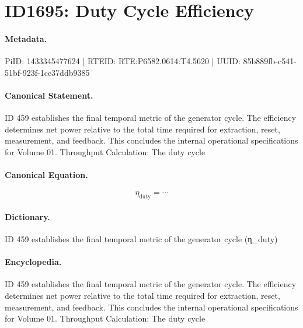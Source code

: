 \section*{ID1695: Duty Cycle Efficiency}
\paragraph{Metadata.}
PiID: 1433345477624 | RTEID: RTE:P6582.0614:T4.5620 | UUID: 85b889fb-c541-51bf-923f-1ce37ddb9385

\paragraph{Canonical Statement.}
ID 459 establishes the final temporal metric of the generator cycle. The efficiency determines net power relative to the total time required for extraction, reset, measurement, and feedback. This concludes the internal operational specifications for Volume 01. Throughput Calculation: The duty cycle

\paragraph{Canonical Equation.}
\[
\eta_{\text{duty}} = \cdots
\]

\paragraph{Dictionary.}
ID 459 establishes the final temporal metric of the generator cycle (η\_duty)

\paragraph{Encyclopedia.}
ID 459 establishes the final temporal metric of the generator cycle. The efficiency determines net power relative to the total time required for extraction, reset, measurement, and feedback. This concludes the internal operational specifications for Volume 01. Throughput Calculation: The duty cycle

